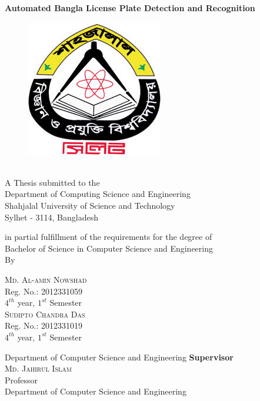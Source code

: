 \documentclass{standalone}
\begin{document}
\begin{titlepage}
\begin{center}
    \vspace{0.5cm}
    {\Large \bf Automated Bangla License Plate Detection and Recognition}
    \begin{figure}[h]
	\centering
	\includegraphics[scale=0.6]{./img/varsityLogo}
	\end{figure}\\
    
    \vspace{0.5cm}
	A Thesis submitted to the \\
    {\large Department of Computing Science and Engineering}\\
    {\Large Shahjalal University of Science and Technology}\\
    Sylhet - 3114, Bangladesh
	
	in partial fulfillment of the requirements for the degree of \\
        
    {\Large Bachelor of Science in Computer Science and Engineering}\\
    
    \vfill {\LARGE By}\\
    \begin{multicols}{2}
    \textsc{\Large Md. Al-amin Nowshad }\\
    Reg. No.: 2012331059\\ $4^{th}$ year, $1^{st}$ Semester\\
    \textsc{\Large Sudipto Chandra Das} \\
    Reg. No.: 2012331019\\ $4^{th}$ year, $1^{st}$ Semester\\ 
	\end{multicols}
	
    \vfill Department of Computer Science and Engineering
    \vfill
    {\bf Supervisor}\\
    \textsc{\Large Md. Jahirul Islam} \\
    Professor\\ 
	Department of Computer Science and Engineering\\
    

\end{center}
\end{titlepage}
\end{document}
